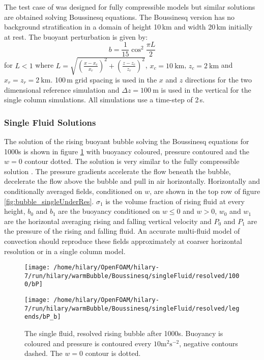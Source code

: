 \documentclass[draft]{agujournal2019}
\begin{document}
The test case of  was designed for fully compressible
models but similar solutions are obtained solving Boussinesq equations.
The Boussinesq version has no background stratification in a domain
of height 10\,km and width 20\,km initially at rest. The buoyant
perturbation is given by:
\begin{equation}
b=\frac{1}{15}\cos^{2}\frac{\pi L}{2}\label{eq:thetaPerturb}
\end{equation}
for $L<1$ where $L=\sqrt{\left(\frac{x-x_{c}}{x_{r}}\right)^{2}+\left(\frac{z-z_{c}}{z_{r}}\right)^{2}}$,
$x_{c}=10\ \text{km}$, $z_{c}=2\ \text{km}$ and $x_{r}=z_{r}=2\ \text{km}$.
100\,m grid spacing is used in the $x$ and $z$ directions for the
two dimensional reference simulation and $\Delta z=100\ \text{m}$
is used in the vertical for the single column simulations. All simulations
use a time-step of 2\,s.

\subsubsection{Single Fluid Solutions}

The solution of the rising buoyant bubble solving the Boussinesq equations
for 1000s is shown in figure \ref{fig:bubble} with buoyancy coloured,
pressure contoured and the $w=0$ contour dotted. The solution is
very similar to the fully compressible solution \cite{BF02}. The
pressure gradients accelerate the flow beneath the bubble, decelerate
the flow above the bubble and pull in air horizontally. Horizontally
and conditionally averaged fields, conditioned on $w$, are shown
in the top row of figure \ref{fig:bubble_singleUnderRes}. $\sigma_{1}$
is the volume fraction of rising fluid at every height, $b_{0}$ and
$b_{1}$ are the buoyancy conditioned on $w\le0$ and $w>0$, $w_{0}$
and $w_{1}$ are the horizontal averaging rising and falling vertical
velocity and $P_{0}$ and $P_{1}$ are the pressure of the rising
and falling fluid. An accurate multi-fluid model of convection should
reproduce these fields approximately at coarser horizontal resolution
or in a single column model. 

\begin{figure}
\noindent \begin{centering}
\texttt{[image: /home/hilary/OpenFOAM/hilary-7/run/hilary/warmBubble/Boussinesq/singleFluid/resolved/1000/bP]}
\par\end{centering}
\noindent \begin{centering}
\texttt{[image: /home/hilary/OpenFOAM/hilary-7/run/hilary/warmBubble/Boussinesq/singleFluid/resolved/legends/bP\_b]}
\par\end{centering}
\caption{The single fluid, resolved rising bubble after 1000s. Buoyancy is
coloured and pressure is contoured every $10\text{m}^{2}\text{s}^{-2}$,
negative contours dashed. The $w=0$ contour is dotted. \label{fig:bubble}}
\end{figure}
\end{document}

